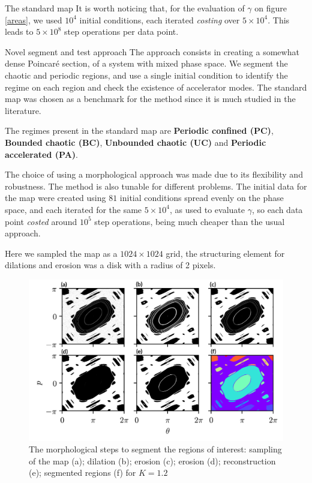 \documentclass[final]{beamer}
\newlength{\colwidth}
\begin{document}
\begin{frame}[t]
\begin{columns}[t]
\begin{column}{\colwidth}
\begin{block}{The standard map}
  It is worth noticing that, for the evaluation of $\gamma$ on figure \ref{areas}, we used $10^4$ initial conditions, each iterated \textit{costing}  over $5\times10^4$. This leads to $5\times 10^8$ step operations per data point.

\end{block}
  
\begin{block}{Novel segment and test approach}
 The approach consists in creating a somewhat dense Poincaré section, of a system with mixed phase space. We segment the chaotic and periodic regions, and use a single initial condition to identify the regime on each region and check the existence of accelerator modes. The standard map was chosen as a benchmark for the method since it is much studied in the literature.

  The regimes present in the standard map are \textbf{Periodic confined (PC)}, \textbf{Bounded chaotic (BC)}, \textbf{Unbounded chaotic (UC)} and \textbf{Periodic accelerated (PA)}.

  The choice of using a morphological approach was made due to its flexibility and robustness. The method is also tunable for different problems. The initial data for the map were created using $81$ initial conditions spread evenly on the phase space, and each iterated for the same $5\times 10^4$, as used to evaluate $\gamma$, so each data point \textit{costed} around $10^5$ step operations, being much cheaper than the usual approach.

  Here we sampled the map as a $1024\times1024$ grid, the structuring element for dilations and erosion was a disk with a radius of 2 pixels. 

  \begin{figure}
    \includegraphics[width = 1.0\textwidth]{mm_6_2.png}
    \caption{The morphological steps to segment the regions of interest: sampling of the map (a); dilation (b); erosion (c); erosion (d); reconstruction (e); segmented regions (f) for $K = 1.2$}
  \end{figure}


\end{block}
\end{column}
\end{columns}
\end{frame}
\end{document}
